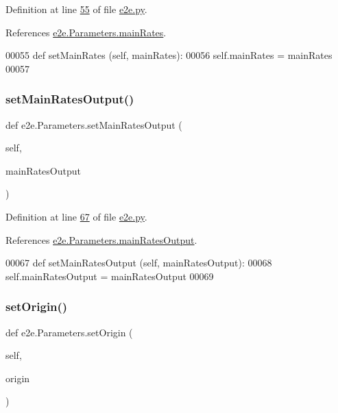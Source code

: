 Definition at line \hyperlink{e2e_8py_source_l00055}{55} of file \hyperlink{e2e_8py_source}{e2e.\+py}.



References \hyperlink{e2e_8py_source_l00029}{e2e.\+Parameters.\+main\+Rates}.


\begin{DoxyCode}
00055     \textcolor{keyword}{def }setMainRates (self, mainRates):
00056         self.mainRates = mainRates
00057 
\end{DoxyCode}
\mbox{\label{classe2e_1_1_parameters_ae71495be8b331f293e0d66b3251a21e9}} 
\subsubsection{\texorpdfstring{set\+Main\+Rates\+Output()}{setMainRatesOutput()}}
{\footnotesize\ttfamily def e2e.\+Parameters.\+set\+Main\+Rates\+Output (\begin{DoxyParamCaption}\item[{}]{self,  }\item[{}]{main\+Rates\+Output }\end{DoxyParamCaption})}



Definition at line \hyperlink{e2e_8py_source_l00067}{67} of file \hyperlink{e2e_8py_source}{e2e.\+py}.



References \hyperlink{e2e_8py_source_l00031}{e2e.\+Parameters.\+main\+Rates\+Output}.


\begin{DoxyCode}
00067     \textcolor{keyword}{def }setMainRatesOutput (self, mainRatesOutput):
00068         self.mainRatesOutput = mainRatesOutput
00069 
\end{DoxyCode}
\mbox{\label{classe2e_1_1_parameters_a421e56e53ff0aaf5222229d8a81c456b}} 
\subsubsection{\texorpdfstring{set\+Origin()}{setOrigin()}}
{\footnotesize\ttfamily def e2e.\+Parameters.\+set\+Origin (\begin{DoxyParamCaption}\item[{}]{self,  }\item[{}]{origin }\end{DoxyParamCaption})}



